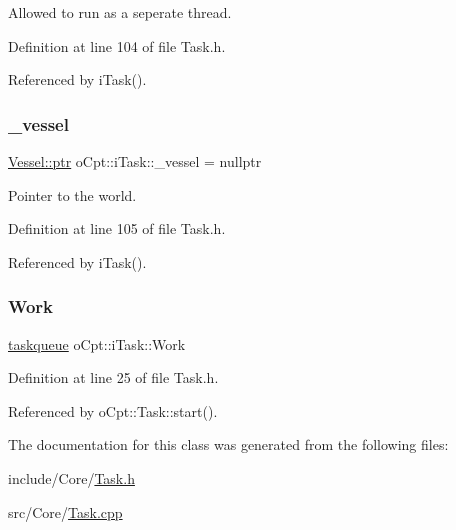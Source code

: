 Allowed to run as a seperate thread. 



Definition at line 104 of file Task.\+h.



Referenced by i\+Task().

\hypertarget{classo_cpt_1_1i_task_ac6cc57220c87f87cdd4d1749119ae0cb}{}\label{classo_cpt_1_1i_task_ac6cc57220c87f87cdd4d1749119ae0cb} 
\subsubsection{\texorpdfstring{\+\_\+vessel}{\_vessel}}
{\footnotesize\ttfamily \hyperlink{classo_cpt_1_1i_vessel_a43711a596f3bdfd0ca732ed3901edc97}{Vessel\+::ptr} o\+Cpt\+::i\+Task\+::\+\_\+vessel = nullptr\hspace{0.3cm}{\ttfamily [protected]}}



Pointer to the world. 



Definition at line 105 of file Task.\+h.



Referenced by i\+Task().

\hypertarget{classo_cpt_1_1i_task_a41287056bebbed04966072dfd1a9f80f}{}\label{classo_cpt_1_1i_task_a41287056bebbed04966072dfd1a9f80f} 
\subsubsection{\texorpdfstring{Work}{Work}}
{\footnotesize\ttfamily \hyperlink{classo_cpt_1_1i_task_a8f949d091241347ea0cdfb8625b4dbca}{taskqueue} o\+Cpt\+::i\+Task\+::\+Work}



Definition at line 25 of file Task.\+h.



Referenced by o\+Cpt\+::\+Task\+::start().



The documentation for this class was generated from the following files\+:\begin{DoxyCompactItemize}
\item 
include/\+Core/\hyperlink{_task_8h}{Task.\+h}\item 
src/\+Core/\hyperlink{_task_8cpp}{Task.\+cpp}\end{DoxyCompactItemize}
